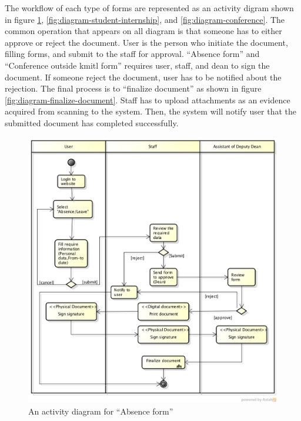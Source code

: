 The workflow of each type of forms are represented as an activity digram shown in figure \ref{fig:diagram-absence}, \ref{fig:diagram-student-internship}, and \ref{fig:diagram-conference}.
The common operation that appears on all diagram is that someone has to either approve or reject the document.
User is the person who initiate the document, filling forms, and submit to the staff for approval.
\enquote{Absence form} and \enquote{Conference outside \gls{kmitl} form} requires user, staff, and dean to sign the document.
If someone reject the document, user has to be notified about the rejection.
The final process is to \enquote{finalize document} as shown in figure \ref{fig:diagram-finalize-document}.
Staff has to upload attachments as an evidence acquired from scanning to the system. 
Then, the system will notify user that the submitted document has completed successfully.
\begin{figure}[h]
	\centering
	\caption{An activity diagram for \enquote{Absence form}}
	\label{fig:diagram-absence}
	\includegraphics[scale=0.5]{res/requirement/absence}
\end{figure}

